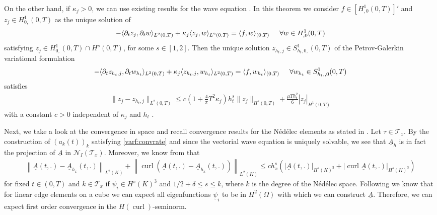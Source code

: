 \documentclass[a4paper,11pt]{article}
\newcommand{\cu}{\operatorname{curl}}
\renewcommand{\vec}[1]{\underline{#1}}
\newcommand{\norm}[1]{{\left\lVert{#1}\right\rVert}}
\begin{document}
	On the other hand, if $\kappa_j>0$, we can use existing results for the wave equation \cite[Thm.~1]{SteinbachZankSpring2019}. In this theorem we consider $f\in [H^1_{,0}(0,T)]'$ and $z_j\in H^1_{0,} (0, T )$  as the unique solution of 
	\begin{align*}
		-\langle\partial_tz_j,\partial_tw\rangle_{L^2(0,T)}+\kappa_j \langle z_j,w\rangle_{L^2(0,T)} =\langle f,w\rangle_{(0,T)} \hspace*{.5cm} \forall w\in H^1_{,0}(0,T)
	\end{align*}
	satisfying $z_j\in H^1_{0,} (0, T ) \cap H^s (0, T ) $, for some $s \in[1, 2]$. Then the unique solution ${z}_{h_t,j} \in S^1_{h_t,0,} (0, T )$ of the Petrov-Galerkin  variational formulation
	\begin{align*}
		-\langle\partial_t{z}_{h_t,j},\partial_tw_{h_t}\rangle_{L^2(0,T)}+\kappa_j \langle {z}_{h_t,j},w_{h_t}\rangle_{L^2(0,T)} =\langle f,w_{h_t}\rangle_{(0,T)} \hspace*{.5cm} \forall w_{h_t}\in S^1_{h_t,,0} (0, T )
	\end{align*}
	satisfies
	\begin{align*}
		\|z_j-{z}_{h_t,j}\|_{L^2(0,T)}\leq c\left(1+\frac{4}{\pi}T^2\kappa_j\right)h_t^s\|z_j\|_{H^{s}(0,T)} + \frac{\mu Th_t^2}{6}|z_j|_{H^1(0,T)}
	\end{align*}
	with a constant $c > 0$ independent of $\kappa_j$ and $h_t$ .
	
	Next, we take a look at the convergence in space and recall convergence results for the Nédélec elements as stated in \cite[Ch.~5.5]{Monk}. Let $\tau\in\mathcal{T}_x$. By the construction of $(a_k(t))_k$ satisfying \eqref{varf:convrate} and since the vectorial wave equation is uniquely solvable, we see that $\vec A_h$ is in fact the projection of $\vec A$ in $\mathcal N_I(\mathcal{T}_x)$. Moreover, we know from \cite[Thm.~5.41]{Monk} that
	\begin{align*}
		\norm{\vec A(t,.)-	\vec A_{h_x}(t,.)}_{L^2(K)} + \norm{\cu(\vec A(t,.)-	\vec A_{h_x}(t,.))}_{L^2(K)}\leq c h_x^s (|\vec A(t,.)|_{H^s(K) ^3} +|\cu \vec A(t,.)|_{H^s(K) ^3} )
	\end{align*}
	for fixed $t\in(0,T)$ and $k\in \mathcal T_x$ if $\psi_i\in H^s(K) ^3$ and $1/2+\delta \leq s\leq k$, where $k$ is the degree of the Nédélec space. Following \cite[Rmk.~7.30]{Monk} we know that for linear edge elements on a cube we can expect all eigenfunctions $\vec \psi_i$ to be in $H^2(\Omega)$ with which we can construct $\vec A$. Therefore, we can expect first order convergence in the $H(\cu)$-seminorm.
	
\end{document}
